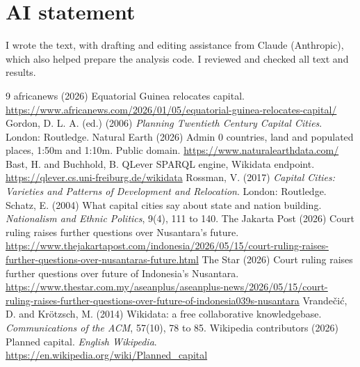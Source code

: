 \documentclass[11pt,a4paper]{article}
\begin{document}
\section*{AI statement}
I wrote the text, with drafting and editing assistance from Claude (Anthropic), which also helped prepare the analysis code. I reviewed and checked all text and results.

\begin{thebibliography}{9}
 africanews (2026) Equatorial Guinea relocates capital. \url{https://www.africanews.com/2026/01/05/equatorial-guinea-relocates-capital/}
 Gordon, D. L. A. (ed.) (2006) \emph{Planning Twentieth Century Capital Cities}. London: Routledge.
 Natural Earth (2026) Admin 0 countries, land and populated places, 1:50m and 1:10m. Public domain. \url{https://www.naturalearthdata.com/}
 Bast, H. and Buchhold, B. QLever SPARQL engine, Wikidata endpoint. \url{https://qlever.cs.uni-freiburg.de/wikidata}
 Rossman, V. (2017) \emph{Capital Cities: Varieties and Patterns of Development and Relocation}. London: Routledge.
 Schatz, E. (2004) What capital cities say about state and nation building. \emph{Nationalism and Ethnic Politics}, 9(4), 111 to 140.
 The Jakarta Post (2026) Court ruling raises further questions over Nusantara's future. \url{https://www.thejakartapost.com/indonesia/2026/05/15/court-ruling-raises-further-questions-over-nusantaras-future.html}
 The Star (2026) Court ruling raises further questions over future of Indonesia's Nusantara. \url{https://www.thestar.com.my/aseanplus/aseanplus-news/2026/05/15/court-ruling-raises-further-questions-over-future-of-indonesia039s-nusantara}
 Vrande\v{c}i\'c, D. and Kr\"otzsch, M. (2014) Wikidata: a free collaborative knowledgebase. \emph{Communications of the ACM}, 57(10), 78 to 85.
 Wikipedia contributors (2026) Planned capital. \emph{English Wikipedia}. \url{https://en.wikipedia.org/wiki/Planned_capital}
\end{thebibliography}
\end{document}
